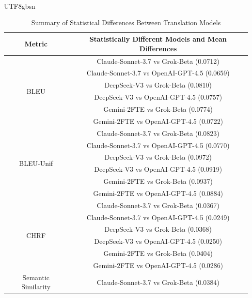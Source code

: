 \documentclass[conference]{IEEEtran}
\begin{document}
\begin{CJK*}{UTF8}{gbsn}
\begin{table}[h]
    \centering
    \caption{Summary of Statistical Differences Between Translation Models}
    \begin{tabular}{cc}
        \hline
        \textbf{Metric} & \textbf{Statistically Different Models and Mean Differences} \\
        \hline
        \multirow{6}{*}{BLEU} & Claude-Sonnet-3.7 vs Grok-Beta (0.0712) \\
                              & Claude-Sonnet-3.7 vs OpenAI-GPT-4.5 (0.0659) \\
                              & DeepSeek-V3 vs Grok-Beta (0.0810) \\
                              & DeepSeek-V3 vs OpenAI-GPT-4.5 (0.0757) \\
                              & Gemini-2FTE vs Grok-Beta (0.0774) \\
                              & Gemini-2FTE vs OpenAI-GPT-4.5 (0.0722) \\
        \hline
        \multirow{6}{*}{BLEU-Unif} & Claude-Sonnet-3.7 vs Grok-Beta (0.0823) \\
                                   & Claude-Sonnet-3.7 vs OpenAI-GPT-4.5 (0.0770) \\
                                   & DeepSeek-V3 vs Grok-Beta (0.0972) \\
                                   & DeepSeek-V3 vs OpenAI-GPT-4.5 (0.0919) \\
                                   & Gemini-2FTE vs Grok-Beta (0.0937) \\
                                   & Gemini-2FTE vs OpenAI-GPT-4.5 (0.0884) \\
        \hline
        \multirow{6}{*}{CHRF} & Claude-Sonnet-3.7 vs Grok-Beta (0.0367) \\
                              & Claude-Sonnet-3.7 vs OpenAI-GPT-4.5 (0.0249) \\
                              & DeepSeek-V3 vs Grok-Beta (0.0368) \\
                              & DeepSeek-V3 vs OpenAI-GPT-4.5 (0.0250) \\
                              & Gemini-2FTE vs Grok-Beta (0.0404) \\
                              & Gemini-2FTE vs OpenAI-GPT-4.5 (0.0286) \\
        \hline
        \multirow{6}{*}{Semantic Similarity} & Claude-Sonnet-3.7 vs Grok-Beta (0.0384) \\

\end{tabular}
\end{table}
\end{CJK*}
\end{document}
